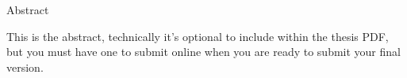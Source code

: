 
\LARGE 
Abstract

\normalsize
This is the abstract, technically it's optional to include within the thesis PDF, but you must have one to submit online when you are ready to submit your final version.  



